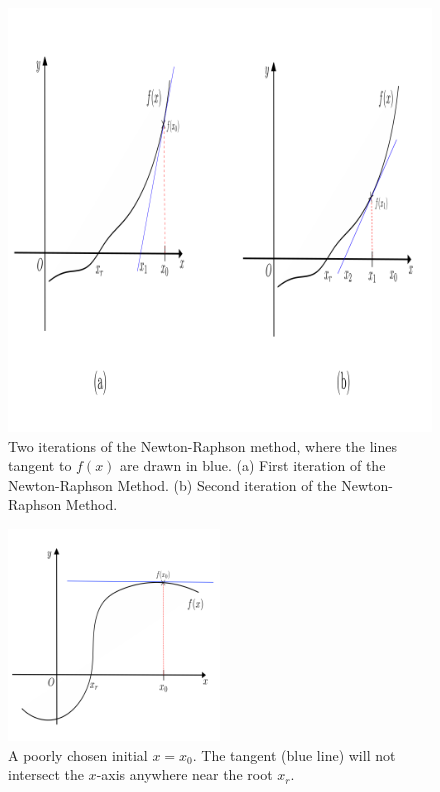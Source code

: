 \begin{figure}[htbp]
    \centering
    \includegraphics[width = 1\textwidth]{Chapter 4/9. newton raphson.png}
    \caption{Two iterations of the Newton-Raphson method, where the lines tangent to $f(x)$ are drawn in blue. (a) First iteration of the Newton-Raphson Method. (b) Second iteration of the Newton-Raphson Method.}
    \label{fig: newton}
\end{figure}

\begin{figure}[htbp]
    \centering
    \includegraphics[width = 0.5\textwidth]{Chapter 4/10. bad newton raphson.png}
    \caption{A poorly chosen initial $x=x_0$. The tangent (blue line) will not intersect the $x$-axis anywhere near the root $x_r$.}
    \label{fig: bad newton}
\end{figure}

